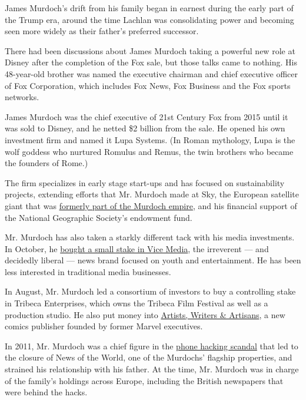 James Murdoch's drift from his family began in earnest during the early
part of the Trump era, around the time Lachlan was consolidating power
and becoming seen more widely as their father's preferred successor.

There had been discussions about James Murdoch taking a powerful new
role at Disney after the completion of the Fox sale, but those talks
came to nothing. His 48-year-old brother was named the executive
chairman and chief executive officer of Fox Corporation, which includes
Fox News, Fox Business and the Fox sports networks.

James Murdoch was the chief executive of 21st Century Fox from 2015
until it was sold to Disney, and he netted \$2 billion from the sale. He
opened his own investment firm and named it Lupa Systems. (In Roman
mythology, Lupa is the wolf goddess who nurtured Romulus and Remus, the
twin brothers who became the founders of Rome.)

The firm specializes in early stage start-ups and has focused on
sustainability projects, extending efforts that Mr. Murdoch made at Sky,
the European satellite giant that was
\href{https://www.bbc.com/news/business-45654792}{formerly part of the
Murdoch empire}, and his financial support of the National Geographic
Society's endowment fund.

Mr. Murdoch has also taken a starkly different tack with his media
investments. In October, he
\href{https://www.nytimes.com/2019/10/10/business/media/james-murdoch-vice-media.html}{bought
a small stake in Vice Media}, the irreverent --- and decidedly liberal
--- news brand focused on youth and entertainment. He has been less
interested in traditional media businesses.

In August, Mr. Murdoch led a consortium of investors to buy a
controlling stake in Tribeca Enterprises, which owns the Tribeca Film
Festival as well as a production studio. He also put money into
\href{https://www.nytimes.com/2019/03/20/arts/awa-comic-books-publisher.html}{Artists,
Writers \& Artisans}, a new comics publisher founded by former Marvel
executives.

In 2011, Mr. Murdoch was a chief figure in the
\href{https://www.nytimes.com/topic/organization/british-phone-hacking-scandal-leveson-report}{phone
hacking scandal} that led to the closure of News of the World, one of
the Murdochs' flagship properties, and strained his relationship with
his father. At the time, Mr. Murdoch was in charge of the family's
holdings across Europe, including the British newspapers that were
behind the hacks.

